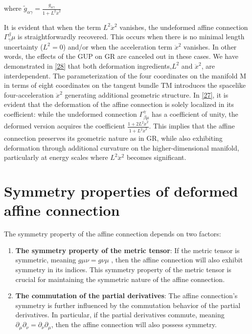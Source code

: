 \documentclass{article}
\begin{document}
where $\tilde{g}_{\alpha\gamma} = \frac{{g_{\alpha\gamma}}}{{1 + L^2\ddot x^2}}$

It is evident that when the term $L^2\ddot x^2$ vanishes, the undeformed affine connection $\Gamma_\gamma^\beta\mu$ is straightforwardly recovered. This occurs when there is no minimal length uncertainty ($L^2 = 0$) and/or when the acceleration term $\ddot x^2$ vanishes. In other words, the effects of the GUP on GR are canceled out in these cases. We have demonstrated in \eqref{28} that both deformation ingredients,$ L^2$ and $\ddot x ^2$, are interdependent. The parameterization of the four coordinates on the manifold M in terms of eight coordinates on the tangent bundle TM introduces the spacelike four-acceleration $\ddot x ^2$ generating additional geometric structure. In \eqref{27}, it is evident that the deformation of the affine connection is solely localized in its coefficient: while the undeformed connection ${\Gamma^\gamma_{\beta\mu}}$ has a coefficient of unity, the deformed version acquires the coefficient $\frac{{1 + 2L^2\ddot x^2}}{{1 + L^2\ddot x^2}}$. This implies that the affine connection preserves its geometric nature as in GR, while also exhibiting deformation through additional curvature on the higher-dimensional manifold, particularly at energy scales where $L^2\ddot x^2$ becomes significant.






\section{\Large Symmetry properties of deformed affine connection}
\label{sec:Symmetry Properties of deformed affine connection}
The symmetry property of the affine connection depends on two factors: 
\begin{enumerate}
\item \textbf{The symmetry property of the metric tensor}: If the metric tensor is symmetric, meaning $g\mu \nu = g\nu \mu$ , then the affine connection will also exhibit symmetry in its indices. This symmetry property of the metric tensor is crucial for maintaining the symmetric nature of the affine connection.

\item \textbf{The commutation of the partial derivatives}: The affine connection's symmetry is further influenced by the commutation behavior of the partial derivatives. In particular, if the partial derivatives commute, meaning $\partial_\mu \partial_\nu = \partial_\nu \partial_\mu
$, then the affine connection will also possess symmetry.
\end{enumerate}
\end{document}
